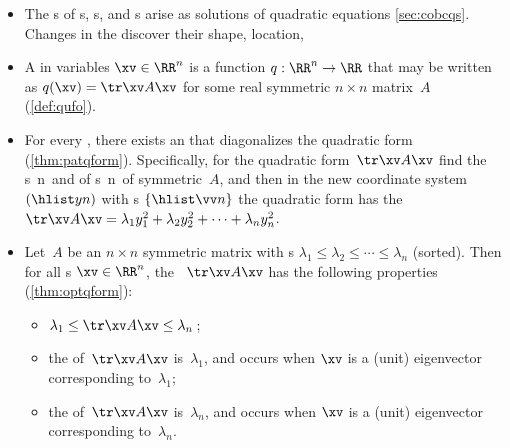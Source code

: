 \begin{itemize}
\itemhi For every real ~\(A\), 
matrix~\(A\) is symmetric iff it is  (\cref{thm:symspec}).

\item The s of s, s, and s arise as solutions of quadratic equations \cref{sec:cobcqs}.
Changes in the  discover their shape, location, 

\item A  in variables \(\xv\in\RR^n\) is a function \(q:\RR^n\to\RR\) that may be written as \(q(\xv)=\tr\xv A\xv\) for some real symmetric \(n\times n\) matrix~\(A\) (\cref{def:qufo}).

\item For every , there exists an   that diagonalizes the quadratic form (\cref{thm:patqform}).
Specifically, for the quadratic form~\(\tr\xv A\xv\) find the 
s~\hlist\lambda n\ and  of s~\hlist\vv n\ of symmetric~\(A\), and then in the new coordinate system~\((\hlist yn)\) with s \(\{\hlist\vv n\}\) the quadratic form has the  \(\tr\xv A\xv=\lambda_1y_1^2+\lambda_2y_2^2+\cdots+\lambda_ny_n^2\).

\item Let~\(A\) be an \(n\times n\) symmetric matrix with s \(\lambda_1\leq\lambda_2\leq\cdots\leq\lambda_n\) (sorted). 
Then for all s \(\xv\in\RR^n\), the ~\(\tr\xv A\xv\) has the following properties (\cref{thm:optqform}):
\begin{itemize}
\item \(\lambda_1\leq \tr\xv A\xv\leq\lambda_n\)\,;
\item the  of~\(\tr\xv A\xv\) is~\(\lambda_1\), and occurs when \(\xv\) is a (unit) eigenvector corresponding to~\(\lambda_1\);
\item the  of~\(\tr\xv A\xv\) is~\(\lambda_n\), and occurs when \(\xv\) is a (unit) eigenvector corresponding to~\(\lambda_n\).
\end{itemize}


\end{itemize}





\makeanswers

